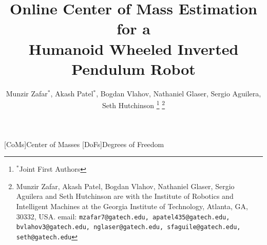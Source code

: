 \documentclass[letterpaper, 10 pt, conference]{ieeeconf}  %
\begin{document}
\frenchspacing

\title{\LARGE \bf Online Center of Mass Estimation for a \\Humanoid Wheeled Inverted Pendulum Robot}

\author{Munzir Zafar$^*$, Akash Patel$^*$, Bogdan Vlahov, Nathaniel Glaser, Sergio Aguilera, Seth Hutchinson
\thanks{$^{*}$Joint First Authors}%
\thanks{Munzir Zafar, Akash Patel, Bogdan Vlahov, Nathaniel Glaser, Sergio Aguilera and Seth Hutchinson are with the Institute of Robotics and Intelligent Machines at the Georgia Institute of Technology, Atlanta, GA, 30332, USA. email: {\tt\small mzafar7@gatech.edu, apatel435@gatech.edu, bvlahov3@gatech.edu, nglaser@gatech.edu, sfaguile@gatech.edu, seth@gatech.edu}}%
}


\begin{acronym}
[CoMs]{Center of Masses}
[DoFs]{Degrees of Freedom}
\end{acronym}
\end{document}
